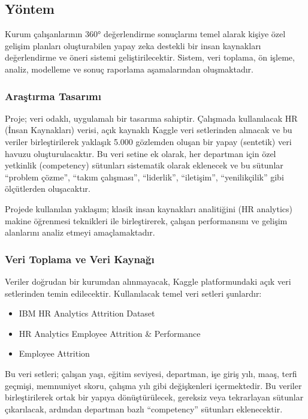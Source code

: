 \documentclass[a4paper,12pt]{article}
\begin{document}
\vspace{2cm}

\subsection*{Yöntem}

\noindent Kurum çalışanlarının 360° değerlendirme sonuçlarını temel alarak kişiye özel gelişim planları oluşturabilen yapay zeka destekli bir insan kaynakları değerlendirme ve öneri sistemi geliştirilecektir. Sistem, veri toplama, ön işleme, analiz, modelleme ve sonuç raporlama aşamalarından oluşmaktadır.

\subsubsection*{Araştırma Tasarımı}

Proje; veri odaklı, uygulamalı bir tasarıma sahiptir. Çalışmada kullanılacak HR (İnsan Kaynakları) verisi, açık kaynaklı Kaggle veri setlerinden alınacak ve bu veriler birleştirilerek yaklaşık 5.000 gözlemden oluşan bir yapay (sentetik) veri havuzu oluşturulacaktır.
Bu veri setine ek olarak, her departman için özel yetkinlik (competency) sütunları sistematik olarak eklenecek ve bu sütunlar “problem çözme”, “takım çalışması”, “liderlik”, “iletişim”, “yenilikçilik” gibi ölçütlerden oluşacaktır.

Projede kullanılan yaklaşım; klasik insan kaynakları analitiğini (HR analytics) makine öğrenmesi teknikleri ile birleştirerek, çalışan performansını ve gelişim alanlarını analiz etmeyi amaçlamaktadır.

\subsubsection*{Veri Toplama ve Veri Kaynağı}
Veriler doğrudan bir kurumdan alınmayacak, Kaggle platformundaki açık veri setlerinden temin edilecektir. Kullanılacak temel veri setleri şunlardır:
\begin{itemize}
    \item IBM HR Analytics Attrition Dataset \cite{ibm_hr_analytics_dataset}
    \item HR Analytics Employee Attrition \& Performance \cite{hr_analytics_attrition}
    \item Employee Attrition \cite{employee_attrition}
\end{itemize}

\noindent Bu veri setleri; çalışan yaşı, eğitim seviyesi, departman, işe giriş yılı, maaş, terfi geçmişi, memnuniyet skoru, çalışma yılı gibi değişkenleri içermektedir. Bu veriler birleştirilerek ortak bir yapıya dönüştürülecek, gereksiz veya tekrarlayan sütunlar çıkarılacak, ardından departman bazlı “competency” sütunları eklenecektir.
\end{document}
